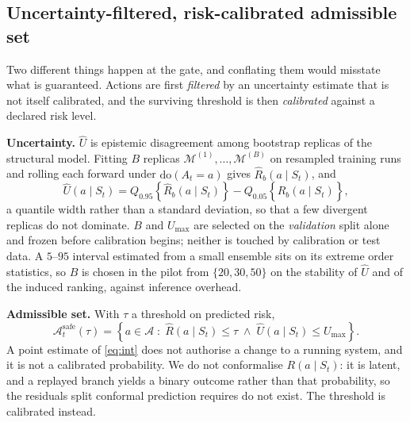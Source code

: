 \documentclass[journal]{IEEEtran}
\newcommand{\Umax}{U_{\max}}
\newcommand{\Aset}{\mathcal{A}}
\newcommand{\Asafe}{\Aset^{\mathrm{safe}}_{t}}
\begin{document}
\subsection{Uncertainty-filtered, risk-calibrated admissible set}
\label{sec:gate}
Two different things happen at the gate, and conflating them would misstate what
is guaranteed. Actions are first \emph{filtered} by an uncertainty estimate that
is not itself calibrated, and the surviving threshold is then \emph{calibrated}
against a declared risk level.

\textbf{Uncertainty.} $\hat{U}$ is epistemic disagreement among bootstrap
replicas of the structural model. Fitting $B$ replicas $\mathcal{M}^{(1)},\dots,
\mathcal{M}^{(B)}$ on resampled training runs and rolling each forward under
$\mathrm{do}(A_t=a)$ gives $\hat{R}_b(a\mid S_t)$, and
\begin{equation}
\hat{U}(a\mid S_t)=Q_{0.95}\!\left\{\hat{R}_b(a\mid S_t)\right\}
-Q_{0.05}\!\left\{\hat{R}_b(a\mid S_t)\right\},
\label{eq:unc}
\end{equation}
a quantile width rather than a standard deviation, so that a few divergent
replicas do not dominate. $B$ and $U_{\max}$ are selected on the
\emph{validation} split alone and frozen before calibration begins; neither is
touched by calibration or test data. A $5$--$95$ interval estimated from a small
ensemble sits on its extreme order statistics, so $B$ is chosen in the pilot
from $\{20,30,50\}$ on the stability of $\hat{U}$ and of the induced ranking,
against inference overhead.

\textbf{Admissible set.} With $\tau$ a threshold on predicted risk,
\begin{equation}
\Asafe(\tau)=\left\{a\in\Aset \;:\; \hat{R}(a\mid S_t)\le\tau
\;\wedge\; \hat{U}(a\mid S_t)\le \Umax\right\}.
\label{eq:feasible}
\end{equation}
A point estimate of \eqref{eq:int} does not authorise a change to a running
system, and it is not a calibrated probability. We do not conformalise
$R(a\mid S_t)$: it is latent, and a replayed branch yields a binary outcome
rather than that probability, so the residuals split conformal prediction
requires do not exist. The threshold is calibrated instead.
\end{document}
